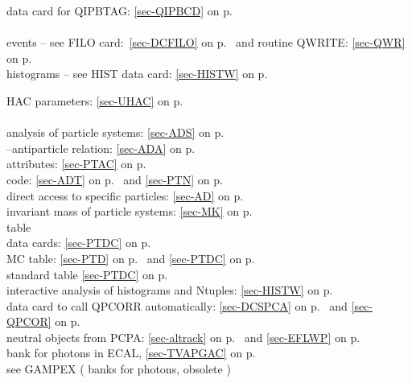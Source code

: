  
 data card for QIPBTAG: \ref{sec-QIPBCD} on p.~\pageref{sec-QIPBCD}\\
 \\
 \mysubitem events -- see FILO card:~\ref{sec-DCFILO} on p.~\pageref{sec-DCFILO}
 and routine QWRITE:
 \ref{sec-QWR} on p.~\pageref{sec-QWR}\\
 \mysubitem histograms -- see HIST data card: \ref{sec-HISTW} on p.~\pageref{sec-HISTW}
 
 
 HAC parameters: \ref{sec-UHAC} on p.~\pageref{sec-UHAC}\\
 \\
 \mysubitem analysis of particle systems: \ref{sec-ADS} on p.~\pageref{sec-ADS}\\
 \mysubitem --antiparticle relation: \ref{sec-ADA} on p.~\pageref{sec-ADA}\\
 \mysubitem attributes: \ref{sec-PTAC} on p.~\pageref{sec-PTAC}\\
 \mysubitem code: \ref{sec-ADT} on p.~\pageref{sec-ADT} and
 \ref{sec-PTN} on p.~\pageref{sec-PTN}\\
 \mysubitem direct access to specific particles: \ref{sec-AD} on p.~\pageref{sec-AD}\\
 \mysubitem invariant mass of particle systems: \ref{sec-MK} on p.~\pageref{sec-MK}\\
 \mysubitem table\\
 \mysubsubitem data cards: \ref{sec-PTDC} on p.~\pageref{sec-PTDC}\\
 \mysubsubitem MC table: \ref{sec-PTD} on p.~\pageref{sec-PTD} and
 \ref{sec-PTDC} on p.~\pageref{sec-PTDC}\\
 \mysubsubitem standard table \ref{sec-PTDC} on p.~\pageref{sec-PTDC}\\
 interactive analysis of histograms and Ntuples:
 \ref{sec-HISTW} on p.~\pageref{sec-HISTW}\\
 data card to call QPCORR automatically: \ref{sec-DCSPCA} on p.~\pageref{sec-DCSPCA}
                    and \ref{sec-QPCOR} on p.~\pageref{sec-QPCOR}\\
 neutral objects from PCPA: \ref{sec-altrack} on p.~\pageref{sec-altrack} and
 \ref{sec-EFLWP} on p.~\pageref{sec-EFLWP}\\
  bank for photons in ECAL, \ref{sec-TVAPGAC} on p.~\pageref{sec-TVAPGAC}\\
 see GAMPEX ( banks for photons, obsolete )\\
